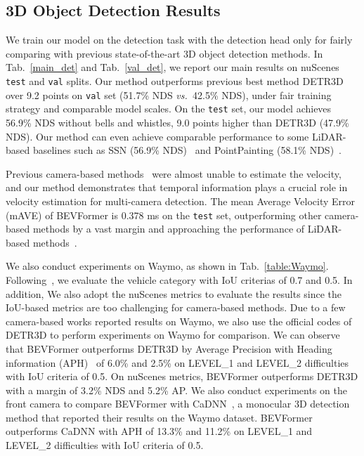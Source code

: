 \documentclass{article}
\begin{document}
\subsection{3D Object Detection Results}

We train our model on the detection task with the detection head only for fairly comparing with previous state-of-the-art 3D object detection methods.
In Tab.~\ref{main_det} and Tab.~\ref{val_det}, we report our main results on nuScenes  \texttt{test} and \texttt{val} splits.  Our method outperforms previous best method DETR3D~\cite{wang2022detr3d} over 9.2 points  on \texttt{val} set (51.7\% NDS \emph{vs.~}42.5\% NDS), under fair training strategy and comparable model scales. On the \texttt{test} set, our model achieves 56.9\% NDS without bells and whistles, 9.0 points higher than DETR3D (47.9\% NDS). Our method can even achieve comparable performance 
to some LiDAR-based baselines such as SSN (56.9\% NDS)~\cite{zhu2020ssn} and PointPainting (58.1\% NDS)~\cite{vora2020pointpainting}. 


Previous camera-based methods~\cite{wang2022detr3d,park2021pseudo,wang2021fcos3d} were almost unable to estimate the velocity, and our method demonstrates that temporal information plays a crucial role in velocity estimation for multi-camera detection.  
The mean Average Velocity Error (mAVE) of BEVFormer is 0.378 ms on the \texttt{test} set, outperforming other camera-based methods by a vast margin and approaching the performance of LiDAR-based methods~\cite{vora2020pointpainting}.

We also conduct experiments on Waymo, as shown in Tab.~\ref{table:Waymo}. Following~\cite{reading2021categorical}, we evaluate the  vehicle category with IoU criterias of 0.7 and 0.5. In addition, We also adopt the nuScenes metrics to evaluate the results since the IoU-based metrics are too challenging for camera-based methods. Due to a few camera-based works reported results on Waymo, we also use the official codes of DETR3D to perform experiments on Waymo for comparison. We can observe that BEVFormer outperforms DETR3D by Average Precision with Heading information (APH)~\cite{sun2020scalability} of 6.0\% and 2.5\% on LEVEL\_1 and LEVEL\_2 difficulties with IoU criteria of 0.5. On nuScenes metrics, BEVFormer outperforms DETR3D with a margin of 3.2\% NDS and 5.2\% AP. We also conduct experiments on the front camera to compare BEVFormer with CaDNN~\cite{reading2021categorical}, a monocular 3D detection method that reported their results on the Waymo dataset. BEVFormer outperforms CaDNN with APH of 13.3\% and 11.2\% on LEVEL\_1 and LEVEL\_2 difficulties with IoU criteria of 0.5. 
\end{document}
